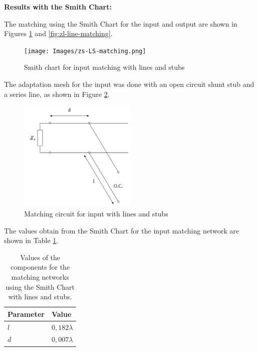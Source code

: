 \vspace{0.4cm}
\textbf{Results with the Smith Chart:}
\vspace{0.4cm}

The matching using the Smith Chart for the input and output are shown in Figures \ref{fig:zs-line-matching} and \ref{fig:zl-line-matching}.

\begin{figure}[H]
    \centering
    \texttt{[image: Images/zs-LS-matching.png]}
    \caption{Smith chart for input matching with lines and stubs}
    \label{fig:zs-line-matching}
\end{figure}

The adaptation mesh for the input was done with an open circuit shunt stub and a series line, as shown in Figure \ref{fig:zs_LS_circuit}.

\begin{figure}[H]
    \centering
    \includegraphics[width=0.5\textwidth]{Images/zs_LS_circuit.png}
    \caption{Matching circuit for input with lines and stubs}
    \label{fig:zs_LS_circuit}
\end{figure}

The values obtain from the Smith Chart for the input matching network are shown in Table \ref{tab:MatchingValuesLinesin}.

\begin{table}[H]
    \centering
    \caption{Values of the components for the matching networks using the Smith Chart with lines and stubs.}
    \begin{tabularx}{\textwidth}{>{\centering\arraybackslash}X >{\centering\arraybackslash}X}
        \toprule
        \textbf{Parameter} & \textbf{Value} \\
        \midrule
        $l$     & $0,182\lambda$ \\
        \midrule
        $d$   & $0,007\lambda$ \\
        \bottomrule
    \end{tabularx}
    \label{tab:MatchingValuesLinesin}
\end{table}

